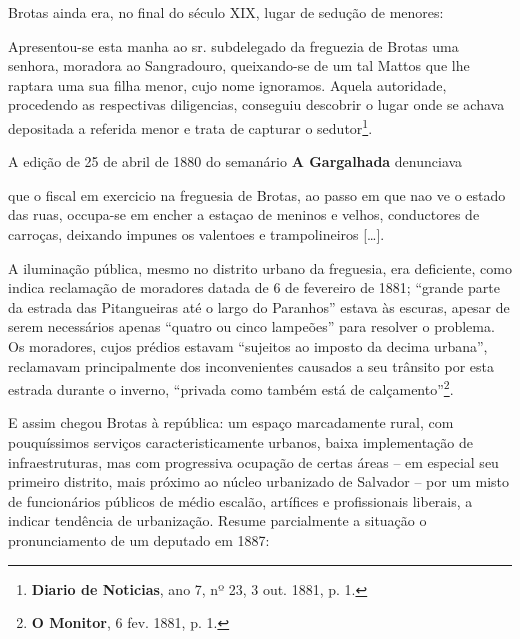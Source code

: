Brotas ainda era, no final do século XIX, lugar de sedução de menores:

\begin{citacao}
Apresentou-se esta manha ao sr. subdelegado da freguezia de Brotas uma senhora, moradora ao Sangradouro, queixando-se de um tal Mattos que lhe raptara uma sua filha menor, cujo nome ignoramos. Aquela autoridade, procedendo as respectivas diligencias, conseguiu descobrir o lugar onde se achava depositada a referida menor e trata de capturar o sedutor\footnote{ \textbf{Diario de Noticias}, ano 7, nº 23, 3 out. 1881, p. 1.}.
\end{citacao}

A edição de 25 de abril de 1880 do semanário \textbf{A Gargalhada} denunciava

\begin{citacao}
que o fiscal em exercicio na freguesia de Brotas, ao passo em que nao ve o estado das ruas, occupa-se em encher a estaçao de meninos e velhos, conductores de carroças, deixando impunes os valentoes e trampolineiros [\dots].
\end{citacao}

A iluminação pública, mesmo no distrito urbano da freguesia, era deficiente, como indica reclamação de moradores datada de 6 de fevereiro de 1881; ``grande parte da estrada das Pitangueiras até o largo do Paranhos'' estava às escuras, apesar de serem necessários apenas ``quatro ou cinco lampeões'' para resolver o problema. Os moradores, cujos prédios estavam ``sujeitos ao imposto da decima urbana'', reclamavam principalmente dos inconvenientes causados a seu trânsito por esta estrada durante o inverno, ``privada como também está de calçamento''\footnote{\textbf{O Monitor}, 6 fev. 1881, p. 1.}.

E assim chegou Brotas à república: um espaço marcadamente rural, com pouquíssimos serviços caracteristicamente urbanos, baixa implementação de infraestruturas, mas com progressiva ocupação de certas áreas -- em especial seu primeiro distrito, mais próximo ao núcleo urbanizado de Salvador -- por um misto de funcionários públicos de médio escalão, artífices e profissionais liberais, a indicar tendência de urbanização. Resume parcialmente a situação o pronunciamento de um deputado em 1887:

